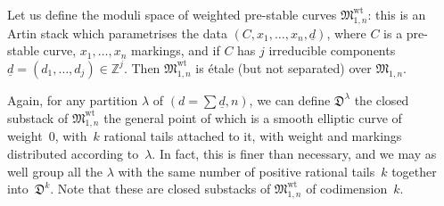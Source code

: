 \documentclass[pdftex]{sigma}
\numberwithin{equation}{section}
\begin{document}
\begin{construction}\label{lboundary}Let us define the moduli space of weighted pre-stable curves $\mathfrak M_{1,n}^\text{wt}$: this is an Artin stack which parametrises the data $(C,x_1,\dots,x_n, \underline{d})$, where $C$ is a pre-stable curve, $x_1,\dots,x_n$ markings, and if $C$ has $j$ irreducible components $\underline{d}=(d_1,\dots,d_j)\in\mathbb{Z}^j$. Then $\mathfrak M_{1,n}^\text{wt}$ is \'{e}tale (but not separated) over $\mathfrak M_{1,n}$.

Again, for any partition $\lambda$ of $(d=\sum\underline{d},n)$, we can define $\mathfrak D^\lambda$ the closed substack of $\mathfrak M_{1,n}^\text{wt}$ the general point of which is a smooth elliptic curve of weight~0, with~$k$ rational tails attached to it, with weight and markings distributed according to~$\lambda$. In fact, this is finer than necessary, and we may as well group all the $\lambda$ with the same number of positive rational tails~$k$ together into~$\mathfrak D^k$. Note that these are closed substacks of $\mathfrak M_{1,n}^\text{wt}$ of codimension~$k$.
\end{construction}
\end{document}
